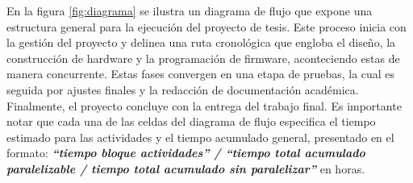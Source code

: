 %

%
%
%

%

En la figura \ref{fig:diagrama} se ilustra un diagrama de flujo que expone una estructura general para la ejecución del proyecto de tesis. Este proceso inicia con la gestión del proyecto y delinea una ruta cronológica que engloba el diseño, la construcción de hardware y la programación de firmware, aconteciendo estas de manera concurrente. Estas fases convergen en una etapa de pruebas, la cual es seguida por ajustes finales y la redacción de documentación académica. Finalmente, el proyecto concluye con la entrega del trabajo final. Es importante notar que cada una de las celdas del diagrama de flujo especifica el tiempo estimado para las actividades y el tiempo acumulado general, presentado en el formato: \textbf{\textit{``tiempo bloque actividades'' / ``tiempo total acumulado paralelizable / tiempo total acumulado sin paralelizar''}} en horas.



